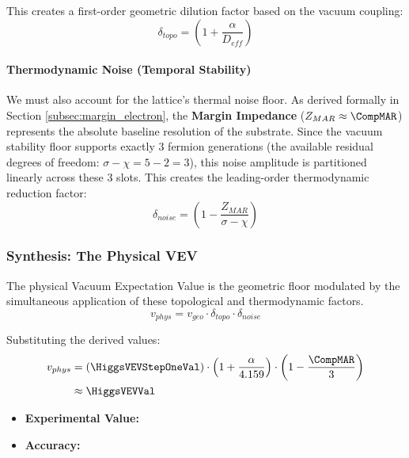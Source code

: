This creates a first-order geometric dilution factor based on the vacuum coupling:
\begin{equation}
\delta_{topo} = \left( 1 + \frac{\alpha}{D_{eff}} \right)
\end{equation}

\paragraph{Thermodynamic Noise (Temporal Stability)}
We must also account for the lattice's thermal noise floor. As derived formally in Section \ref{subsec:margin_electron}, the \textbf{Margin Impedance} ($Z_{MAR} \approx \CompMAR$) represents the absolute baseline resolution of the substrate. Since the vacuum stability floor supports exactly 3 fermion generations (the available residual degrees of freedom: $\sigma - \chi = 5 - 2 = 3$), this noise amplitude is partitioned linearly across these 3 slots. This creates the leading-order thermodynamic reduction factor:
\begin{equation}
\delta_{noise} = \left( 1 - \frac{Z_{MAR}}{\sigma - \chi} \right)
\end{equation}

\subsubsection{Synthesis: The Physical VEV}
The physical Vacuum Expectation Value is the geometric floor modulated by the simultaneous application of these topological and thermodynamic factors.
\begin{equation}
v_{phys} = v_{geo} \cdot \delta_{topo} \cdot \delta_{noise}
\end{equation}

Substituting the derived values:
\begin{equation}
\begin{split}
v_{phys} &= (\HiggsVEVStepOneVal) \cdot \left( 1 + \frac{\alpha}{4.159} \right) \cdot \left( 1 - \frac{\CompMAR}{3} \right) \\
& \approx \mathbf{\HiggsVEVVal}
\end{split}
\end{equation}

\begin{itemize}
    \item \textbf{Experimental Value:} \HiggsVEVExperimentalValue
    \item \textbf{Accuracy:} \HiggsVEVAccText
\end{itemize}

